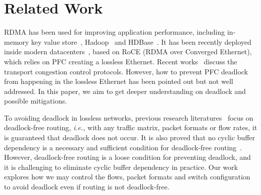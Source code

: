 \section{Related Work}

 RDMA has been used for improving application performance,
including in-memory key value store~\cite{mitchell13atc, farm, kalia14sigcomm}, 
Hadoop~\cite{hadooprdma} and HDBase~\cite{hdbaserdma}.
It has been recently deployed inside modern datacenters~\cite{timely,dcqcn,rdmascale}, based on
RoCE (RDMA over Converged Ethernet), which relies on PFC creating a lossless Ethernet.
Recent works~\cite{timely,dcqcn} discuss the transport congestion control protocols. However,
how to prevent PFC deadlock from happening in the lossless Ethernet has been pointed out 
but not well addressed. In this paper, we aim to get deeper understanding on deadlock 
and possible mitigations.

 To avoiding deadlock in lossless networks, previous research 
literatures~\cite{tcpbolt,karol2003prevention} focus on deadlock-free routing, 
{\em i.e.,} with any traffic matrix, packet formats or flow rates, it is guaranteed that deadlock 
does not occur. It is also proved that no cyclic buffer dependency is a necessary and
sufficient condition for deadlock-free routing~\cite{deadlockfree}. However, deadlock-free
routing is a loose condition for preventing deadlock, and it is challenging to eliminate 
cyclic buffer dependency in practice. Our work explores how we may control the flows,
packet formats and switch configuration to avoid deadlock even if routing is not deadlock-free.






